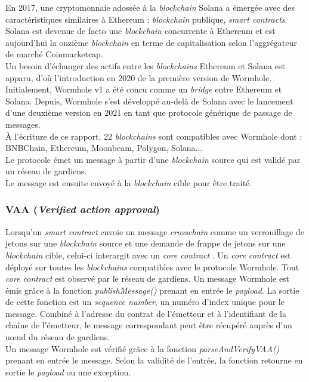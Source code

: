 En 2017, une cryptomonnaie adossée à la \textit{\gls{blockchain}} Solana a émergée avec des caractéristiques
similaires à Ethereum : \textit{\gls{blockchain}} publique, \textit{\gls{smart contract}s}.\\
Solana est devenue de facto une \textit{\gls{blockchain}} concurrente à Ethereum et est aujourd'hui 
la onzième \textit{\gls{blockchain}} en terme de capitalisation selon l'aggrégateur de marché Coinmarketcap.\\
Un besoin d'échanger des \gls{actif}s entre les \textit{\gls{blockchain}s} Ethereum et Solana est apparu, 
d'où l'introduction en 2020 de la première version de Wormhole.
Initialement, Wormhole v1 a été concu comme un \textit{bridge} entre Ethereum et Solana.
Depuis, Wormhole s'est développé au-delà de Solana avec le lancement d'une deuxième version en 2021 
en tant que protocole générique de passage de messages.\\
À l'écriture de ce rapport, 22 \cite{wormholeNetwork} \textit{\gls{blockchain}s} sont compatibles avec Wormhole 
dont : BNBChain, Ethereum, Moonbeam, Polygon, Solana...\\
Le protocole émet un message à partir d'une \textit{\gls{blockchain}} source qui est validé par un réseau de 
gardiens.\\ 
Le message est ensuite envoyé à la \textit{\gls{blockchain}} cible pour être traité.

\subsubsection{VAA (\textit{Verified action approval})}

Lorsqu'un \textit{\gls{smart contract}} envoie un message \textit{crosschain} comme un verrouillage
de jetons sur une \textit{\gls{blockchain}} source et une demande de frappe de jetons sur une 
\textit{\gls{blockchain}} cible, celui-ci interargit avec un \textit{core contract} \cite{wormholeCoreContract}.
Un \textit{core contract} est déployé sur toutes les \textit{\gls{blockchain}s} compatibles avec le protocole 
Wormhole. Tout \textit{core contract} est observé par le réseau de gardiens.
Un message Wormhole est émis grâce à la fonction \textit{publishMessage()} prenant en entrée le \textit{payload}.
La sortie de cette fonction est un \textit{sequence number}, un numéro d'index unique pour le message.
Combiné à l'adresse du contrat de l'émetteur et à l'identifiant de la chaîne de l'émetteur, le message 
correspondant peut être récupéré auprès d'un nœud du réseau de gardiens.\\
Un message Wormhole est vérifié grâce à la fonction \textit{parseAndVerifyVAA()} prenant en entrée le message.
Selon la validité de l'entrée, la fonction retourne en sortie le \textit{payload} ou une exception.
\newpage

